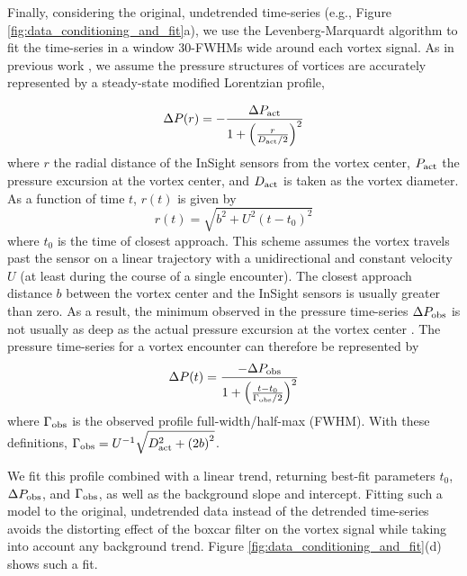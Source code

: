 \documentclass[linenumbers,trackchanges]{aastex63}
\begin{document}
Finally, considering the original, undetrended time-series (e.g., Figure \ref{fig:data_conditioning_and_fit}a), we use the Levenberg-Marquardt algorithm \citep[cf.][]{Press2007} to fit the time-series in a window 30-FWHMs wide around each vortex signal. As in previous work \citep[e.g.,][]{2016JGRE..121.1514K}, we assume the pressure structures of vortices are accurately represented by a steady-state modified Lorentzian profile,

\begin{equation}
    \Delta P(r) = -\frac{\Delta P_{\rm act}}{1 + \left( \frac{r}{D_{\rm act}/2} \right)^2}\label{eqn:radial_lorentzian_profile}
\end{equation}
where $r$ the radial distance of the InSight sensors from the vortex center, $P_{\rm act}$ the pressure excursion at the vortex center, and $D_{\rm act}$ is taken as the vortex diameter. As a function of time $t$, $r(t)$ is given by
\begin{equation}
    r(t) = \sqrt{b^2 + U^2 \left( t - t_0 \right)^2}\label{eqn:radial_distance}
\end{equation}
where $t_0$ is the time of closest approach. This scheme assumes the vortex travels past the sensor on a linear trajectory with a unidirectional and constant velocity $U$ (at least during the course of a single encounter). The closest approach distance $b$ between the vortex center and the InSight sensors is usually greater than zero. As a result, the minimum observed in the pressure time-series $\Delta P_{\rm obs}$ is not usually as deep as the actual pressure excursion at the vortex center \citep{2018Icar..299..166J, 2019Icar..317..209K}. The pressure time-series for a vortex encounter can therefore be represented by 
\begin{equation}
    \Delta P(t) = \frac{-\Delta P_{\rm obs}}{1 + \left( \frac{ t - t_0 }{\Gamma_{\rm obs}/2} \right)^2}\label{eqn:Lorentzian_profile}
\end{equation}
where $\Gamma_{\rm obs}$ is the observed profile full-width/half-max (FWHM). With these definitions, $\Gamma_{\rm obs} = U^{-1} \sqrt{D_{\rm act}^2 + \left( 2 b \right)^2}$. 

We fit this profile combined with a linear trend, returning best-fit parameters $t_0$, $\Delta P_{\rm obs}$, and $\Gamma_{\rm obs}$, as well as the background slope and intercept. Fitting such a model to the original, undetrended data instead of the detrended time-series avoids the distorting effect of the boxcar filter on the vortex signal while taking into account any background trend. Figure \ref{fig:data_conditioning_and_fit}(d) shows such a fit.
\end{document}
